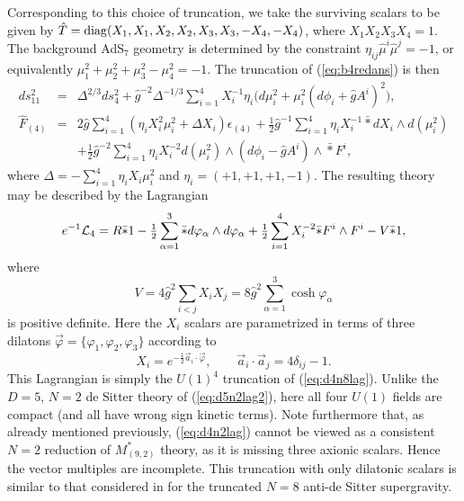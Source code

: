 \documentclass[a4paper,12pt]{article}
\newcommand{\fft}[2]{{\frac{#1}{#2}}}
\newcommand{\ft}[2]{{\textstyle\frac{#1}{#2}}}
\begin{document}
Corresponding to this choice of truncation, we take the surviving
scalars to be given by $\hat T={\rm diag}(X_1,X_1,X_2,
X_2,X_3,X_3,-X_4,-X_4)$, where $X_1X_2X_3X_4=1$.  The background AdS$_7$
geometry is determined by the constraint $\eta_{ij}\hat\mu^i\hat\mu^j=-1$,
or equivalently $\mu_1^2+\mu_2^2+\mu_3^2-\mu_4^2=-1$.  The truncation of
(\ref{eq:b4redans}) is then
%
\begin{eqnarray}
ds_{11}^2&=&\Delta^{2/3}ds_4^2+\hat g^{-2}\Delta^{-1/3}\sum_{i=1}^4
X_i^{-1}\eta_i\bigl(d\mu_i^2+\mu_i^2(d\phi_i+\hat g A^i)^2),\nonumber\\
\hat F_{(4)}&=&2\hat g\sum_{i=1}^4(\eta_iX_i^2\mu_i^2+\Delta
X_i)\epsilon_{(4)}+\fft12\hat g^{-1}\sum_{i=1}^4 \eta_i X_i^{-1}\bar *
dX_i\wedge d(\mu_i^2)\nonumber\\
&&+\fft12\hat g^{-2}\sum_{i=1}^4 \eta_iX_i^{-2}d(\mu_i^2)\wedge
(d\phi_i-\hat gA^i)\wedge\bar *F^i,
\end{eqnarray}
%
where $\Delta=-\sum_{i=1}^4\eta_iX_i\mu_i^2$ and $\eta_i=(+1,+1,+1,-1)$.
The resulting theory may be described by the Lagrangian
%
\begin{equation}
e^{-1}{\cal L}_4 = R\bar *1-\ft12\sum_{\alpha=1}^3\bar*d\varphi_\alpha\wedge
d\varphi_\alpha+\ft12\sum_{i=1}^4 X_i^{-2}\bar*F^i\wedge F^i-V\bar*1,
\label{eq:d4n2lag}
\end{equation}
%
where
%
\begin{equation}
V=4\hat g^2 \sum_{i<j}{X_iX_j}=8\hat g^2\sum_{\alpha=1}^3\cosh\varphi_\alpha
\end{equation}
%
is positive definite.  Here the $X_i$ scalars are parametrized in terms of
three dilatons $\vec\varphi=\{\varphi_1,\varphi_2,\varphi_3\}$ according to
%
\begin{equation}
X_i=e^{-\fft12\vec a_i\cdot\vec\varphi},\qquad
\vec a_i\cdot\vec a_j=4\delta_{ij}-1.
\end{equation}
%
This Lagrangian is simply the $U(1)^4$ truncation of (\ref{eq:d4n8lag}).
Unlike the $D=5$, $N=2$ de Sitter theory of (\ref{eq:d5n2lag2}), here
all four $U(1)$ fields are compact (and all have wrong sign kinetic
terms).  Note furthermore that, as already mentioned previously,
(\ref{eq:d4n2lag}) cannot be viewed as a consistent $N=2$ reduction of
$M^*_{(9,2)}$ theory, as it is missing three axionic scalars.  Hence
the vector multiples are incomplete.  This truncation with only dilatonic
scalars is similar to that considered in \cite{Duff:1999gh} for the
truncated $N=8$ anti-de Sitter supergravity.
\end{document}
